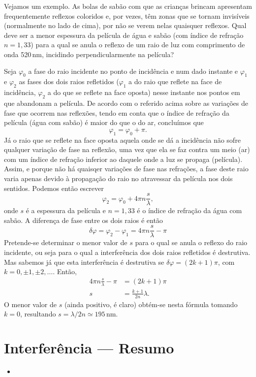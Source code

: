 Vejamos um exemplo. As bolas de sabão com que as crianças brincam apresentam
frequentemente reflexos coloridos e, por vezes, têm zonas que se tornam
invisíveis (normalmente no lado de cima), por não se verem nelas quaisquer
reflexos. Qual deve ser a menor espessura da película de água e sabão (com
índice de refração $n=1,33$) para a qual se anula o reflexo de um raio de luz
com comprimento de onda 520\,nm, incidindo perpendicularmente na película?

Seja $\varphi_0$ a fase do raio incidente no ponto de incidência e num dado
instante e $\varphi_1$ e $\varphi_2$ as fases dos dois raios refletidos
($\varphi_1$ a do raio que reflete na face de incidência, $\varphi_2$ a do que
se reflete na face oposta) nesse instante nos pontos em que abandonam a
película. De acordo com o referido acima sobre as variações de fase que ocorrem
nas reflexões, tendo em conta que o índice de refração da película (água com
sabão) é maior do que o do ar, concluímos que 
\begin{equation*}
\varphi_1=\varphi_0+\pi.
\end{equation*}
Já o raio que se reflete na face oposta aquela onde se dá a incidência não sofre
qualquer variação de fase na reflexão, uma vez que ela se faz contra um meio
(ar) com um índice de refração inferior ao daquele onde a luz se propaga
(película). Assim, e porque não há quaisqer variações de fase nas refrações, a
fase deste raio varia apenas devido à propagação do raio no atravessar da
película nos dois sentidos. Podemos então escrever
\begin{equation*}
\varphi_2= \varphi_0+4\pi n\frac{s}{\lambda},
\end{equation*}
onde $s$ é a espessura da película e $n=1,33$ é o índice de refração da água com
sabão. A diferença de fase entre os dois raios é então
\begin{equation*}
\delta\varphi = \varphi_2-\varphi_1=4\pi n\frac{s}{\lambda}-\pi
\end{equation*}
Pretende-se determinar o menor valor de $s$ para o qual se anula o reflexo do
raio incidente, ou seja para o qual a interferência dos dois raios refletidos é
destrutiva. Mas sabemos já que esta interferência é destrutiva se
$\delta\varphi=(2k+1)\pi$, com $k=0,\pm1,\pm2,\ldots$. Então,
\begin{align*}
4\pi n\frac{s}{\lambda}-\pi&=(2k+1)\pi\\
s&=\frac{k+1}{2n}\lambda.
\end{align*}
O menor valor de $s$ (ainda positivo, é claro) obtém-se nesta fórmula tomando
$k=0$, resultando $s=\lambda/2n\simeq 195$\,nm.

\newpage
\section*{Interferência --- Resumo}
\tobedone{}
\begin{itemize}[leftmargin=*]
  \item
\end{itemize}
